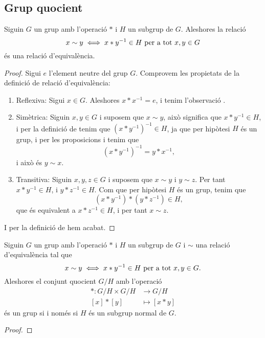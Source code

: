 \documentclass[../../Main.tex]{subfiles}
\begin{document}
	\subsection{Grup quocient}
	\begin{proposition}
		\label{prop:relacio entre grups és d'equivalència}
		\label{TODO:grup quocient}
		Siguin \(G\) un grup amb l'operació \(\ast\) i \(H\) un subgrup de \(G\). Aleshores la relació
		\[x\sim y\iff x\ast y^{-1}\in H\text{ per a tot }x,y\in G\]
		és una relació d'equivalència.
		\begin{proof}
			Sigui \(e\) l'element neutre del grup \(G\). Comprovem les propietats de la definició de relació d'equivalència:
			\begin{enumerate}
				\item Reflexiva: Sigui \(x\in G\). Aleshores \(x\ast x^{-1}=e\), i tenim l'observació .
				\item Simètrica: Siguin \(x,y\in G\) i suposem que \(x\sim y\), això significa que \(x\ast y^{-1}\in H\), i per la definició de  tenim que \((x\ast y^{-1})^{-1}\in H\), ja que per hipòtesi \(H\) és un grup, i per les proposicions  i  tenim que
				\[(x\ast y^{-1})^{-1}=y\ast x^{-1},\]
				i això és \(y\sim x\).
				\item Transitiva: Siguin \(x,y,z\in G\) i suposem que \(x\sim y\) i \(y\sim z\). Per tant \(x\ast y^{-1}\in H\), i \(y\ast z^{-1}\in H\). Com que per hipòtesi \(H\) és un grup, tenim que
				\[(x\ast y^{-1})\ast(y\ast z^{-1})\in H,\]
				que és equivalent a \(x\ast z^{-1}\in H\), i per tant \(x\sim z\).
			\end{enumerate}
			I per la definició de  hem acabat.
		\end{proof}
	\end{proposition}
	\begin{proposition}\label{prop:grup quocient}
		Siguin \(G\) un grup amb l'operació \(\ast\) i \(H\) un subgrup de \(G\) i \(\sim\) una relació d'equivalència tal que
		\[x\sim y\iff x\ast y^{-1}\in H\text{ per a tot }x,y\in G.\]
		Aleshores el conjunt quocient \(G/H\) amb l'operació
		\begin{align*}
		\ast\colon G/H\times G/H&\longrightarrow G/H\\
		[x]\ast[y]&\longmapsto[x\ast y]
		\end{align*}
		és un grup si i només si \(H\) és un subgrup normal de \(G\).
		\begin{proof}
		\end{proof}
	\end{proposition}
\end{document}
